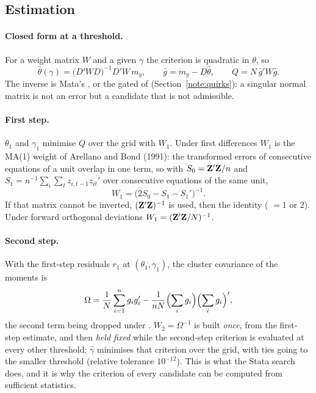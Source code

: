 \documentclass[
  10.5pt,
  a4paper,
]{article}
\begin{document}
\subsection{Estimation}\label{note:est}

\paragraph{Closed form at a threshold.} For a weight matrix $W$ and a given $\gamma$ the criterion is
quadratic in $\theta$, so
\begin{equation}\label{eq:theta}
\hat\theta(\gamma)=\bigl(D'WD\bigr)^{-1}D'W\,m_y,\qquad
\bar g=m_y-D\hat\theta,\qquad Q=N\,\bar g'W\bar g .
\end{equation}
The inverse is Mata's , or the gated  of 
(Section~\ref{note:quirks}): a singular normal matrix is not an error but a candidate that is not
admissible.

\paragraph{First step.} $\theta_1$ and $\gamma_1$ minimise $Q$ over the grid with $W_1$. Under first
differences $W_1$ is the MA(1) weight of Arellano and Bond (1991): the transformed errors of
consecutive equations of a unit overlap in one term, so with $S_0=\mathbf{Z}'\mathbf{Z}/n$ and
$S_1=n^{-1}\sum_i\sum_t z_{i,t-1}z_{it}'$ over consecutive equations of the same unit,
\begin{equation}\label{eq:w1}
W_1=\bigl(2S_0-S_1-S_1'\bigr)^{-1}.
\end{equation}
If that matrix cannot be inverted, $(\mathbf{Z}'\mathbf{Z})^{-1}$ is used, then the identity
( $=1$ or $2$). Under forward orthogonal deviations $W_1=(\mathbf{Z}'\mathbf{Z}/N)^{-1}$.

\paragraph{Second step.} With the first-step residuals $r_1$ at $(\theta_1,\gamma_1)$, the cluster
covariance of the moments is
\begin{equation}\label{eq:omega}
\Omega=\frac1N\sum_{i=1}^n g_ig_i'-\frac{1}{nN}\Bigl(\sum_i g_i\Bigr)\Bigl(\sum_i g_i\Bigr)',
\end{equation}
the second term being dropped under . $W_2=\Omega^{-1}$ is built \emph{once}, from the
first-step estimate, and then \emph{held fixed} while the second-step criterion is evaluated at every
other threshold; $\hat\gamma$ minimises that criterion over the grid, with ties going to the smaller
threshold (relative tolerance $10^{-12}$). This is what the Stata search does, and it is why the
criterion of every candidate can be computed from sufficient statistics.
\end{document}

